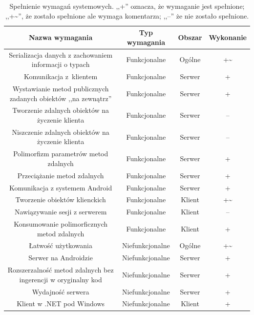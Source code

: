 \begin{table}[htbp]
	  \caption[Spełnienie wymagań systemowych.]{Spełnienie wymagań systemowych. ,,+'' oznacza, że wymaganie jest spełnione; ,,+\textasciitilde'', że zostało spełnione ale wymaga komentarza; ,,--'' że nie zostało spełnione.}
	\begin{adjustbox}{center}
		\begin{tabular}{ @{}| c | c | c | c | }
			\hline
				\textbf{Nazwa wymagania} & \textbf{Typ wymagania} & \textbf{Obszar} & \textbf{Wykonanie}\\
				\hline \hline
				Serializacja danych z zachowaniem informacji o typach & Funkcjonalne & Ogólne & +\textasciitilde\\
				\hline
				
				Komunikacja z~klientem & Funkcjonalne & Serwer & +\\
				\hline
				Wystawianie metod publicznych zadanych obiektów ,,na zewnątrz'' & Funkcjonalne & Serwer & + \\
				\hline
				Tworzenie zdalnych obiektów na życzenie klienta & Funkcjonalne & Serwer & -- \\
				\hline
				Niszczenie zdalnych obiektów na życzenie klienta & Funkcjonalne & Serwer & -- \\
				\hline
				Polimorfizm parametrów metod zdalnych & Funkcjonalne & Serwer & + \\
				\hline
				Przeciążanie metod zdalnych & Funkcjonalne & Serwer & + \\
				\hline
				Komunikacja z systemem Android & Funkcjonalne & Serwer & + \\
				\hline
				
				Tworzenie obiektów klienckich & Funkcjonalne & Klient & +\textasciitilde \\
				\hline
				Nawiązywanie sesji z serwerem & Funkcjonalne & Klient & -- \\
				\hline
				Konsumowanie polimorficznych metod zdalnych & Funkcjonalne & Klient & + \\
				\hline
				
				Łatwość użytkowania & Niefunkcjonalne & Ogólne & +\textasciitilde \\
				\hline
				Serwer na Androidzie & Niefunkcjonalne & Serwer & + \\
				\hline
				Rozszerzalność metod zdalnych bez ingerencji w oryginalny kod & Niefunkcjonalne & Serwer & + \\
				\hline
				Wydajność serwera & Niefunkcjonalne & Serwer & + \\
				\hline
				Klient w .NET pod Windows & Niefunkcjonalne & Klient & + \\
				\hline
		\end{tabular}
	\end{adjustbox}
	\label{tab:requirements-fulfilment}
\end{table}


